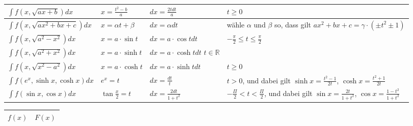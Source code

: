 \documentclass[a4paper]{article}
\begin{document}
\begin{appendix}
\begin{fmerke}[Standardsubstitutionen]
\begin{tabular*}{0.98\textwidth}{l|l|l|p{7.8cm}}
				$\int f(x,\sqrt{ax+b})dx$
					& $x=\frac{t^2-b}{a}$
					& $dx=\frac{2tdt}{a}$
					& $t\geq 0$\\ \hline
		
				$\int f(x,\sqrt{ax^2+bx+c})dx$
					& $x=\alpha t+\beta$
					& $dx=\alpha dt$
					& wähle $\alpha$ und $\beta$ so, dass gilt
						$ax^2+bx+c=\gamma\cdotp(\pm t^2\pm 1)$ \\ \hline
		
				$\int f(x,\sqrt{a^2-x^2})dx$
					& $x=a\cdot\sin t$
					& $dx=a \cdot\cos t dt$
					& $-\frac{\pi}{2}\leq t \leq \frac{\pi}{2}$\\ \hline
		
				$\int f(x,\sqrt{a^2+x^2})dx$
					& $x=a \cdot \sinh t$
					& $dx=a \cdot \cosh t dt$
					$t\in\mathbb{R}$\\ \hline
		
				$\int f(x,\sqrt{x^2-a^2})dx$
					& $x=a\cdot \cosh t$
					& $dx=a\cdot \sinh t dt$
					& $t \geq 0$\\ \hline
		
				$\int f(e^x, \sinh x, \cosh x)dx$
					& $e^x=t$
					& $dx=\frac{dt}{t}$
					& $t>0$, und dabei gilt $\sinh x =\frac{t^2-1}{2t}$,
						$\cosh x= \frac{t^2+1}{2t}$ \\ \hline
		
				$\int f(\sin x, \cos x)dx$
					& $\tan \frac{x}{2} = t$
					& $dx=\frac{2dt}{1+t^2}$
					& $-\frac{\Pi}{2}<t<\frac{\Pi}{2}$, und dabei
						gilt $\sin x =\frac{2t}{1+t^2}$, $\cos x = \frac{1-t^2}{1+t^2}$
			\end{tabular*}
		\end{fmerke}
	
	\newpage
 		\begin{fmerke}
			\begin{multicols}{2}
			\renewcommand{\arraystretch}{1.4}
			\begin{tabular}{l|l}
					$f(x)$ & $F(x)$ \\ \hline


\end{tabular}
\end{multicols}
\end{fmerke}
\end{appendix}
\end{document}
